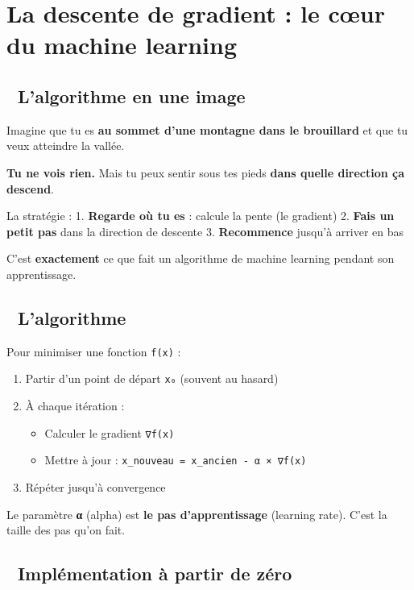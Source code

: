 \documentclass[
  french,
  11pt,
  a4paper,
]{scrbook}
\providecommand{\tightlist}{%
  \setlength{\itemsep}{0pt}\setlength{\parskip}{0pt}}
\begin{document}
\chapter{La descente de gradient : le cœur du machine
learning}\label{la-descente-de-gradient-le-cux153ur-du-machine-learning}

\section{🎢 L'algorithme en une image}\label{lalgorithme-en-une-image}

Imagine que tu es \textbf{au sommet d'une montagne dans le brouillard}
et que tu veux atteindre la vallée.

\textbf{Tu ne vois rien.} Mais tu peux sentir sous tes pieds
\textbf{dans quelle direction ça descend}.

La stratégie : 1. \textbf{Regarde où tu es} : calcule la pente (le
gradient) 2. \textbf{Fais un petit pas} dans la direction de descente 3.
\textbf{Recommence} jusqu'à arriver en bas

C'est \textbf{exactement} ce que fait un algorithme de machine learning
pendant son apprentissage.

\section{📝 L'algorithme}\label{lalgorithme}

Pour minimiser une fonction \texttt{f(x)} :

\begin{enumerate}
\def\labelenumi{\arabic{enumi}.}
\tightlist
\item
  Partir d'un point de départ \texttt{x₀} (souvent au hasard)
\item
  À chaque itération :

  \begin{itemize}
  \tightlist
  \item
    Calculer le gradient \texttt{∇f(x)}
  \item
    Mettre à jour : \texttt{x\_nouveau\ =\ x\_ancien\ -\ α\ ×\ ∇f(x)}
  \end{itemize}
\item
  Répéter jusqu'à convergence
\end{enumerate}

Le paramètre \textbf{α} (alpha) est \textbf{le pas d'apprentissage}
(learning rate). C'est la taille des pas qu'on fait.

\section{🐍 Implémentation à partir de
zéro}\label{impluxe9mentation-uxe0-partir-de-zuxe9ro}
\end{document}
